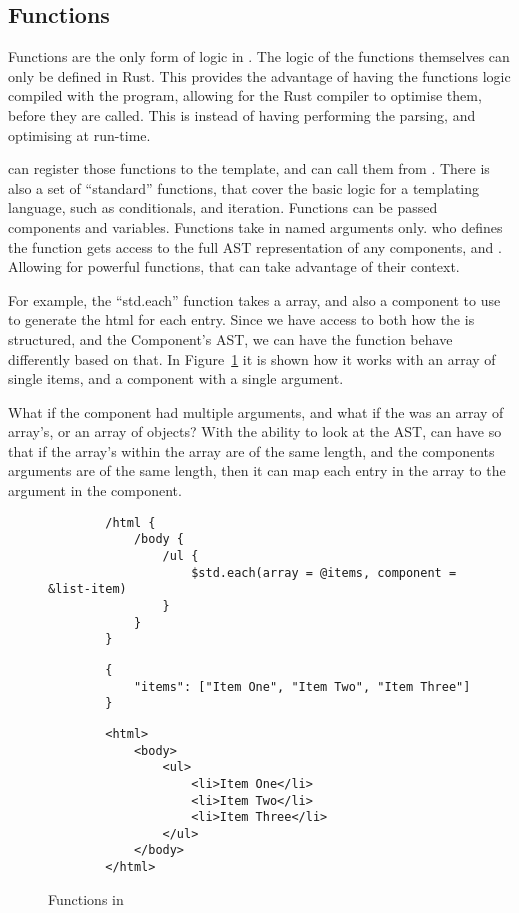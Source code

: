 \subsection{Functions}
Functions are the only form of logic in \languageName{}.  The logic of the functions themselves can only be defined in Rust. This provides the advantage of having the functions logic compiled with the program, allowing for the Rust compiler to optimise them, before they are called. This is instead of having \languageName{} performing the parsing, and optimising at run-time. 

\You{} can register those functions to the template, and can call them from \languageName{}. There is also a set of ``standard'' functions, that cover the basic logic for a templating language, such as conditionals, and iteration. Functions can be passed components and variables. Functions take in named arguments only. \You{} who defines the function gets access to the full AST representation of any components, and . Allowing for powerful functions, that can take advantage of their context.

For example, the ``std.each'' function takes a  array, and also a component to use to generate the html for each entry. Since we have access to both how the  is structured, and the Component's AST, we can have the function behave differently based on that. In Figure~\ref{fig:functionExample} it is shown how it works with an array of single items, and a component with a single argument. 

What if the component had multiple arguments, and what if the  was an array of array's, or an array of  objects? With the ability to look at the AST, \languageName{} can have so that if the array's within the array are of the same length, and the components arguments are of the same length, then it can map each entry in the array to the argument in the component.

\begin{figure}[!htbp]
    \Large{\textbf{\languageName{}}}\normalsize{}
    \begin{verbatim}
        /html {
            /body {
                /ul {
                    $std.each(array = @items, component = &list-item)
                }
            }
        }
    \end{verbatim}
    \Large{\textbf{}}\normalsize{}
    \begin{verbatim}
        {
            "items": ["Item One", "Item Two", "Item Three"]
        }
    \end{verbatim}
    \Large{\textbf{}}\normalsize{}
    \begin{verbatim}
        <html>
            <body>
                <ul>
                    <li>Item One</li>
                    <li>Item Two</li>
                    <li>Item Three</li>
                </ul>
            </body>
        </html>
    \end{verbatim}
    \caption{Functions in \languageName{}}
    \label{fig:functionExample}
\end{figure}